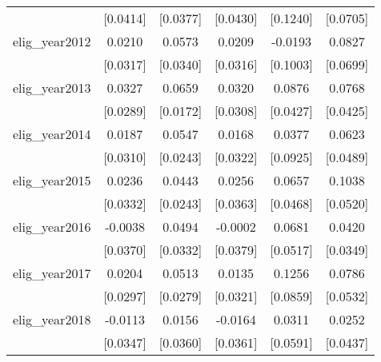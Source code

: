 \begin{table}[htbp]
\begin{tabular}{l*{5}{c}}
                    &    [0.0414]         &    [0.0377]         &    [0.0430]         &    [0.1240]         &    [0.0705]         \\
\addlinespace
elig\_year2012       &      0.0210         &      0.0573         &      0.0209         &     -0.0193         &      0.0827         \\
                    &    [0.0317]         &    [0.0340]         &    [0.0316]         &    [0.1003]         &    [0.0699]         \\
\addlinespace
elig\_year2013       &      0.0327         &      0.0659\sym{***}&      0.0320         &      0.0876\sym{**} &      0.0768\sym{*}  \\
                    &    [0.0289]         &    [0.0172]         &    [0.0308]         &    [0.0427]         &    [0.0425]         \\
\addlinespace
elig\_year2014       &      0.0187         &      0.0547\sym{*}  &      0.0168         &      0.0377         &      0.0623         \\
                    &    [0.0310]         &    [0.0243]         &    [0.0322]         &    [0.0925]         &    [0.0489]         \\
\addlinespace
elig\_year2015       &      0.0236         &      0.0443         &      0.0256         &      0.0657         &      0.1038\sym{*}  \\
                    &    [0.0332]         &    [0.0243]         &    [0.0363]         &    [0.0468]         &    [0.0520]         \\
\addlinespace
elig\_year2016       &     -0.0038         &      0.0494         &     -0.0002         &      0.0681         &      0.0420         \\
                    &    [0.0370]         &    [0.0332]         &    [0.0379]         &    [0.0517]         &    [0.0349]         \\
\addlinespace
elig\_year2017       &      0.0204         &      0.0513\sym{*}  &      0.0135         &      0.1256         &      0.0786         \\
                    &    [0.0297]         &    [0.0279]         &    [0.0321]         &    [0.0859]         &    [0.0532]         \\
\addlinespace
elig\_year2018       &     -0.0113         &      0.0156         &     -0.0164         &      0.0311         &      0.0252         \\
                    &    [0.0347]         &    [0.0360]         &    [0.0361]         &    [0.0591]         &    [0.0437]         \\

\end{tabular}
\end{table}
